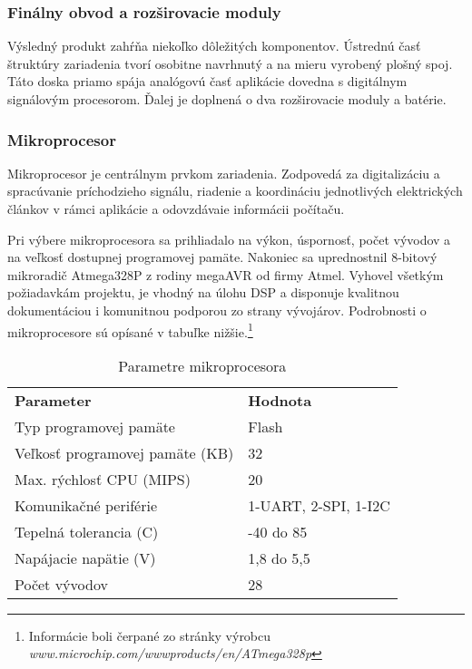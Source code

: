 \documentclass[titlepage,12pt]{article}
\begin{document}
\newpage
\subsubsection{Finálny obvod a rozširovacie moduly}
Výsledný produkt zahŕňa niekoľko dôležitých komponentov. Ústrednú časť štruktúry zariadenia tvorí osobitne navrhnutý a na mieru vyrobený plošný spoj. Táto doska priamo spája analógovú časť aplikácie dovedna s digitálnym signálovým procesorom. Ďalej je doplnená o dva rozširovacie moduly a batérie.

\subsubsection*{Mikroprocesor}
Mikroprocesor je centrálnym prvkom zariadenia. Zodpovedá za digitalizáciu a spracúvanie príchodzieho signálu, riadenie a koordináciu jednotlivých elektrických článkov v rámci aplikácie a odovzdávaie informácii počítaču.

Pri výbere mikroprocesora sa prihliadalo na výkon, úspornosť, počet vývodov a na veľkosť dostupnej programovej pamäte. Nakoniec sa uprednostnil 8-bitový mikroradič Atmega328P z rodiny megaAVR od firmy Atmel. Vyhovel všetkým požiadavkám projektu, je vhodný na úlohu DSP a disponuje kvalitnou dokumentáciou i komunitnou podporou zo strany vývojárov. 
Podrobnosti o mikroprocesore sú opísané v tabuľke nižšie.\footnote{Informácie boli čerpané zo stránky výrobcu \textit{www.microchip.com/wwwproducts/en/ATmega328p}}

\begin{table}[htb]
\begin{tabular}{ll}
\textbf{Parameter}              & \textbf{Hodnota}     \\
Typ programovej pamäte          & Flash                \\
Veľkosť programovej pamäte (KB) & 32                   \\
Max. rýchlosť CPU (MIPS)        & 20                   \\
Komunikačné periférie           & 1-UART, 2-SPI, 1-I2C \\
Tepelná tolerancia (C)          & -40 do 85            \\
Napájacie napätie (V)           & 1,8 do 5,5           \\
Počet vývodov                   & 28                  
\end{tabular}
\caption{Parametre mikroprocesora}
\end{table}
\end{document}
